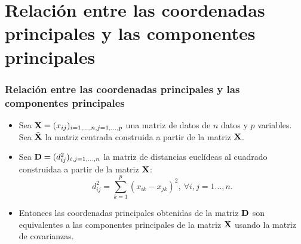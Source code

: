 \section{Relación entre las coordenadas principales y las componentes principales}
\begin{frame}
\frametitle{Relación entre las coordenadas principales y las componentes principales}
\begin{itemize}
\item<2->{Sea $\mathbf{X}=({x}_{ij})_{i=1,\ldots,n,j=1,\ldots,p}$ una matriz de datos de $n$ datos y $p$ variables. Sea $\tilde{\mathbf{X}}$ la matriz centrada construida a partir de la matriz $\mathbf{X}$.}
\item<3->{Sea $\mathbf{D}=(d_{ij}^2)_{i,j=1,\ldots,n}$ la matriz de distancias euclídeas al cuadrado construidaa a partir de la matriz ${\mathbf{X}}$:
$$
d_{ij}^2 = \sum_{k=1}^p ({x}_{ik} -{x}_{jk})^2, \ \forall i,j=1\ldots,n.
$$ }
\item<4->{Entonces las coordenadas principales obtenidas de la matriz $\mathbf{D}$ son equivalentes a las componentes principales de la matriz $\mathbf{X}$ usando la matriz de covarianzas.}
\end{itemize}
\end{frame}

